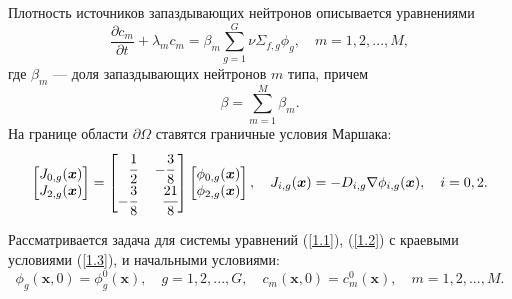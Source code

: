 \documentclass[a4paper,12pt]{article}
\begin{document}
Плотность источников запаздывающих нейтронов описывается уравнениями
\begin{equation}\label{1.2}
 \frac{\partial c_m}{\partial t} + \lambda_m c_m = \beta_m \sum_{g=1}^{G} \nu \Sigma_{f,g} \phi_g,
 \quad m = 1,2, ..., M, 
\end{equation}
где $\beta_m$ --- доля запаздывающих нейтронов  $m$ типа, причем
\[
 \beta = \sum_{m=1}^{M} \beta_m.
\] 
На границе области $\partial \Omega$ ставятся граничные условия Маршака:
\begin{equation}\label{1.3}
\begin{split}
\begin{bmatrix}
J_{0,g}(\bm x)\\
J_{2,g}(\bm x)\\
\end{bmatrix}
=
\begin{bmatrix}
\phantom{-}\cfrac{1}{2} & -\cfrac{3}{8} \\
 -\cfrac{3}{8} & \phantom{-}\cfrac{21}{8} \\
\end{bmatrix}
\begin{bmatrix}
\phi_{0,g}(\bm x) \\
\phi_{2,g}(\bm x) \\
\end{bmatrix},
\quad
J_{i,g}(\bm x) = -D_{i,g}\nabla\phi_{i,g}(\bm x), 
\quad
i = 0, 2.
\end{split}
\end{equation}

Рассматривается задача для системы уравнений (\ref{1.1}), (\ref{1.2}) с краевыми условиями (\ref{1.3}), и начальными условиями:
\begin{equation}\label{1.4}
 \phi_g(\bm x,0) = \phi_g^0(\bm x), 
  \quad  g = 1,2, ..., G ,
 \quad   c_m(\bm x,0) = c_m^0(\bm x), 
  \quad  m = 1,2, ..., M.
\end{equation}
\end{document}
